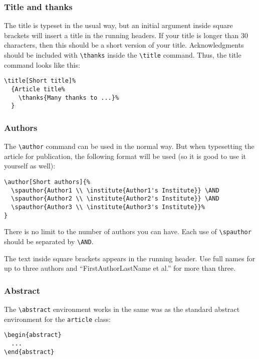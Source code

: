 \documentclass[lucida,final]{sp}
\newcommand{\spcode}[1]{\texttt{#1}}
\newcommand{\cmd}[1]{\texttt{\textbackslash#1}}
\begin{document}
\subsubsection{Title and thanks}

The title is typeset in the usual way, but an initial argument inside
square brackets will insert a title in the running headers.  If your
title is longer than 30 characters, then this should be a short
version of your title.  Acknowledgments should be included with
\cmd{thanks} inside the \cmd{title} command.  Thus, the title command
looks like this:
%
\begin{Verbatim}
\title[Short title]%
  {Article title%
    \thanks{Many thanks to ...}%
  }
\end{Verbatim}


\subsubsection{Authors}

The \cmd{author} command can be used in the normal way.  But when 
typesetting the article for publication, the following format will
be used (so it is good to use it yourself as well):
%
\begin{Verbatim}
\author[Short authors]{%
  \spauthor{Author1 \\ \institute{Author1's Institute}} \AND
  \spauthor{Author2 \\ \institute{Author2's Institute}} \AND
  \spauthor{Author3 \\ \institute{Author3's Institute}}%
}
\end{Verbatim}
%
There is no limit to the number of authors you can have.  Each use of
\cmd{spauthor} should be separated by \cmd{AND}.  

The text inside square brackets appears in the running header. Use
full names for up to three authors and ``FirstAuthorLastName et al.''
for more than three.


\subsubsection{Abstract}

The \cmd{abstract} environment works in the same was as the standard
abstract environment for the \spcode{article} class:
%
\begin{Verbatim}
\begin{abstract}
  ...  
\end{abstract}
\end{Verbatim}
\end{document}
